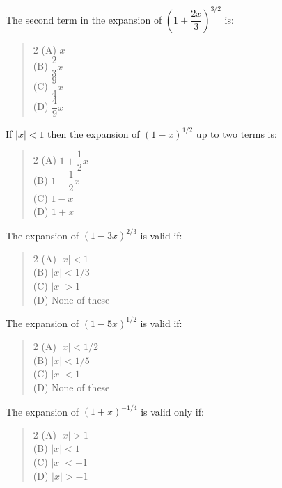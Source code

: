 \documentclass[11pt,a4paper]{article}
\begin{document}
\begin{mcqlist}
\item The second term in the expansion of $\left(1+\dfrac{2x}{3}\right)^{3/2}$ is:
\begin{quote}\begin{multicols}{2}
\noindent (A) $x$ \\
(B) $\dfrac{2}{3}x$ \\
(C) $\dfrac{9}{4}x$ \\
(D) $\dfrac{4}{9}x$
\end{multicols}\end{quote}

\item If $|x|<1$ then the expansion of $(1-x)^{1/2}$ up to two terms is:
\begin{quote}\begin{multicols}{2}
\noindent (A) $1+\dfrac{1}{2}x$ \\
(B) $1-\dfrac{1}{2}x$ \\
(C) $1-x$ \\
(D) $1+x$
\end{multicols}\end{quote}

\item The expansion of $(1-3x)^{2/3}$ is valid if:
\begin{quote}\begin{multicols}{2}
\noindent (A) $|x|<1$ \\
(B) $|x|<1/3$ \\
(C) $|x|>1$ \\
(D) None of these
\end{multicols}\end{quote}

\item The expansion of $(1-5x)^{1/2}$ is valid if:
\begin{quote}\begin{multicols}{2}
\noindent (A) $|x|<1/2$ \\
(B) $|x|<1/5$ \\
(C) $|x|<1$ \\
(D) None of these
\end{multicols}\end{quote}

\item The expansion of $(1+x)^{-1/4}$ is valid only if:
\begin{quote}\begin{multicols}{2}
\noindent (A) $|x|>1$ \\
(B) $|x|<1$ \\
(C) $|x|<-1$ \\
(D) $|x|>-1$
\end{multicols}\end{quote}


\end{mcqlist}
\end{document}
